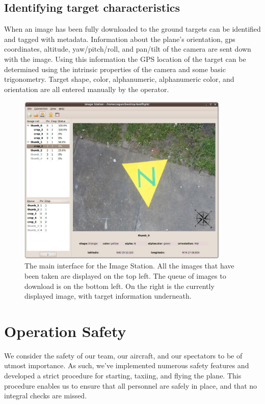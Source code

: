 \documentclass[10pt]{report}
\begin{document}
\subsection{Identifying target characteristics}

When an image has been fully downloaded to the ground targets can be identified and tagged with metadata.  Information about the plane's orientation, gps coordinates, altitude, yaw/pitch/roll, and pan/tilt of the camera are sent down with the image.  Using this information the GPS location of the target can be determined using the intrinsic properties of the camera and some basic trigonometry. Target shape, color, alphanumeric, alphanumeric color, and orientation are all entered manually by the operator.

\begin{figure} [h]
  \centering
  	\includegraphics[width=0.9\textwidth]{../images/ImageStationMain.jpg}
  	\caption[Image Station Interface]{The main interface for the Image Station.  All the images that have been taken are displayed on the top left.  The queue of images to download is on the bottom left.  On the right is the currently displayed image, with target information underneath.}
  	\label{fig:imagestationinterface}
\end{figure}

\section{Operation Safety}

We consider the safety of our team, our aircraft, and our spectators to be of utmost importance.  As such, we've implemented numerous safety features and developed a strict procedure for starting, taxiing, and flying the plane.  This procedure enables us to ensure that all personnel are safely in place, and that no integral checks are missed.
\end{document}
